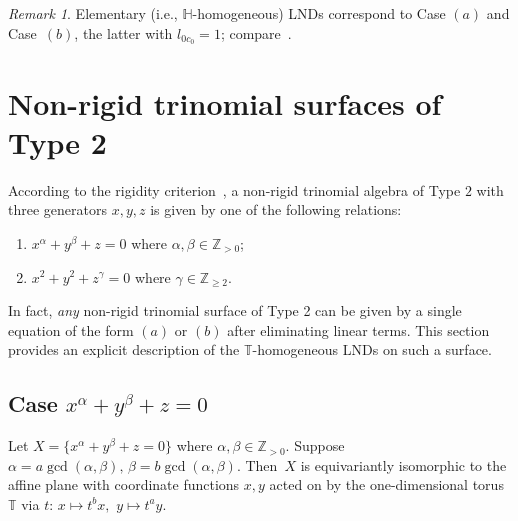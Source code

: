 \documentclass[a4paper,reqno,12pt]{amsart}
\theoremstyle{plain}
\theoremstyle{definition}
\theoremstyle{plain}
\theoremstyle{remark}
\newtheorem{remark}[theorem]{Remark}
\newcommand{\TT}{\mathbb{T}}
\newcommand{\ZZ}{\mathbb Z}
\newcommand{\HH}{\mathbb H}
\begin{document}
\begin{remark}
Elementary (i.e., $\HH$-homogeneous) LNDs correspond to Case $(a)$ and Case~$(b)$, the latter with $l_{0c_0}=1$; compare~\cite[Construction 2]{GZ}.
\end{remark}

\section{Non-rigid trinomial surfaces of Type 2}\label{SectionCases}
According to the rigidity criterion~\cite[Theorem~4]{EGSh}, a non-rigid trinomial algebra of Type $2$ with three generators $x, y, z$ is given by one of the following relations:
    \begin{enumerate}
        \item [$(a)$] $x^\alpha+y^\beta+z=0$ where $\alpha,\beta\in\ZZ_{>0}$;
        \item [$(b)$]$x^2+y^2+z^\gamma=0$ where  $\gamma\in\ZZ_{\ge2}$.
    \end{enumerate}
   In fact, \emph{any} non-rigid trinomial surface of Type 2 can be given by a single equation of the form $(a)$ or $(b)$ after eliminating linear terms. This section provides an explicit description of the ${\TT}$-homogeneous LNDs on such a surface.
\subsection{Case $x^\alpha+y^\beta+z=0$}\label{SectionCasePlane}
Let $X=\{x^\alpha+y^\beta+z=0\}$ where $\alpha,\beta\in\ZZ_{>0}$. Suppose $\alpha=a\gcd(\alpha,\beta),\,\beta=b\gcd(\alpha,\beta)$. Then~$X$ is equivariantly isomorphic to the affine plane with coordinate functions $x,y$ acted on by the one-dimensional torus ${\TT}$ via $t\colon\, x\longmapsto t^b x,\,\,y\longmapsto t^a y$.
\end{document}
